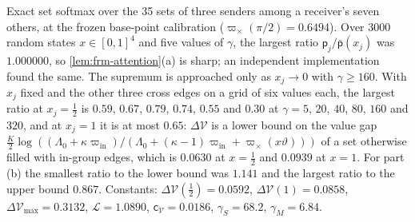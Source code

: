 \begin{numcheck}\label{chk:frm-attention}
Exact set softmax over the 35 sets of three senders among a receiver's seven others, at the frozen base-point calibration ($\varpi_\times(\pi/2)=0.6494$). Over 3000 random states $x\in[0,1]^4$ and five values of $\gamma$, the largest ratio $\mathsf p_j/\bar{\mathsf p}(x_j)$ was $1.000000$, so \cref{lem:frm-attention}(a) is sharp; an independent implementation found the same. The supremum is approached only as $x_j\to0$ with $\gamma\ge160$. With $x_j$ fixed and the other three cross edges on a grid of six values each, the largest ratio at $x_j=\frac12$ is $0.59$, $0.67$, $0.79$, $0.74$, $0.55$ and $0.30$ at $\gamma=5$, $20$, $40$, $80$, $160$ and $320$, and at $x_j=1$ it is at most $0.65$: $\Delta\mathcal V$ is a lower bound on the value gap $\frac K2\log((\Lambda_0+\kappa\varpi_{\mathrm{in}})/(\Lambda_0+(\kappa-1)\varpi_{\mathrm{in}}+\varpi_\times(x\vartheta)))$ of a set otherwise filled with in-group edges, which is $0.0630$ at $x=\frac12$ and $0.0939$ at $x=1$. For part (b) the smallest ratio to the lower bound was $1.141$ and the largest ratio to the upper bound $0.867$. Constants: $\Delta\mathcal V(\frac12)=0.0592$, $\Delta\mathcal V(1)=0.0858$, $\Delta\mathcal V_{\max}=0.3132$, $\mathcal L=1.0890$, $\mathsf c_{\mathcal V}=0.0186$, $\gamma_S=68.2$, $\gamma_M=6.84$.
\end{numcheck}

